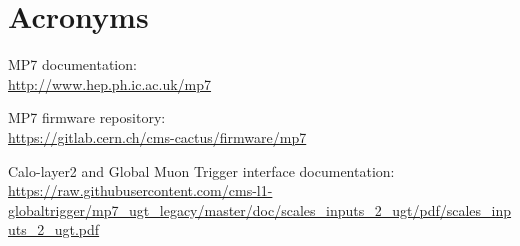 \documentclass[11pt,a4paper,english,titlepage]{article}
\begin{document}
\doctitlepage{}



\doctoc{}

%
% 


% 
% 



% 
% 
% 

\doctables{}

\docfigures{}


%
\section*{Acronyms}
\begin{acronym}

\end{acronym}

\clearpage

\begin{thebibliography}{00}

MP7 documentation:\\
\url{http://www.hep.ph.ic.ac.uk/mp7}

MP7 firmware repository:\\
\url{https://gitlab.cern.ch/cms-cactus/firmware/mp7}


Calo-layer2 and Global Muon Trigger interface documentation:\\
\url{https://raw.githubusercontent.com/cms-l1-globaltrigger/mp7_ugt_legacy/master/doc/scales_inputs_2_ugt/pdf/scales_inputs_2_ugt.pdf}

\end{thebibliography}

\docindex{}

\end{document}
